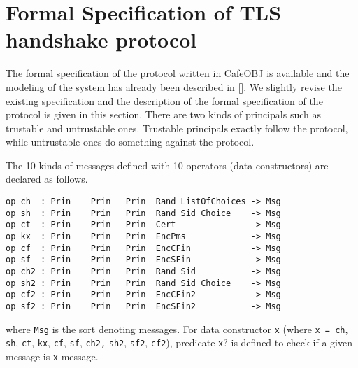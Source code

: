 \documentclass[a4paper,fleqn]{cas-dc}
\begin{document}
\section{Formal Specification of TLS handshake protocol} \label{fstls}
The formal specification of the protocol written in CafeOBJ is available and the modeling of the system has already been described in [\cite{1437139}]. We slightly revise the existing specification and the description of the formal specification of the protocol is given in this section. There are two kinds of principals such as trustable and untrustable ones. Trustable principals exactly follow the protocol, while untrustable ones do something against the protocol. 


The 10 kinds of messages defined with 10 operators (data constructors) are declared as follows.
\begin{small}
		\begin{verbatim}
op ch  : Prin    Prin   Prin  Rand ListOfChoices -> Msg
op sh  : Prin    Prin   Prin  Rand Sid Choice    -> Msg
op ct  : Prin    Prin   Prin  Cert               -> Msg
op kx  : Prin    Prin   Prin  EncPms             -> Msg
op cf  : Prin    Prin   Prin  EncCFin            -> Msg
op sf  : Prin    Prin   Prin  EncSFin            -> Msg
op ch2 : Prin    Prin   Prin  Rand Sid           -> Msg
op sh2 : Prin    Prin   Prin  Rand Sid Choice    -> Msg
op cf2 : Prin    Prin   Prin  EncCFin2           -> Msg
op sf2 : Prin    Prin   Prin  EncSFin2           -> Msg
		\end{verbatim}
	\end{small}
where \verb!Msg! is the sort denoting messages. For data constructor \verb!x! (where \verb!x = ch!, \verb!sh!, \verb!ct!, \verb!kx!, \verb!cf!, \verb!sf!, \verb!ch2,! \verb!sh2!, \verb!sf2!, \verb!cf2!), predicate \verb!x!? is defined to check if a given message is \verb!x! message.
\end{document}
